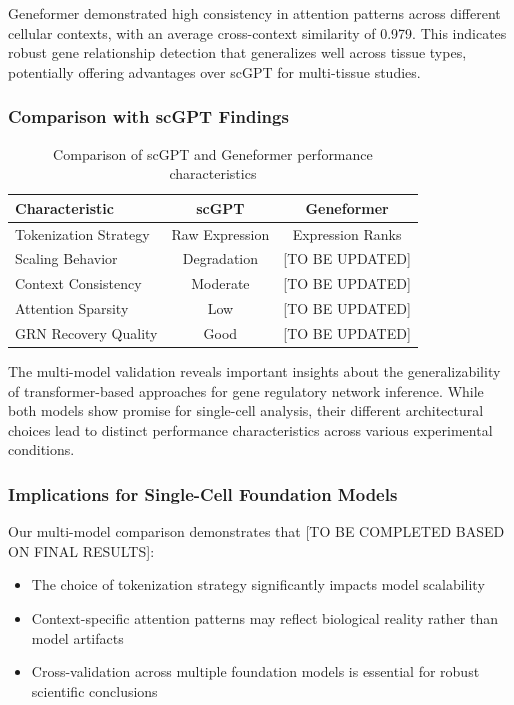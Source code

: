 Geneformer demonstrated high consistency in attention patterns across different cellular contexts, with an average cross-context similarity of 0.979. This indicates robust gene relationship detection that generalizes well across tissue types, potentially offering advantages over scGPT for multi-tissue studies.

\subsubsection{Comparison with scGPT Findings}

\begin{table}[h]
\centering
\caption{Comparison of scGPT and Geneformer performance characteristics}
\label{tab:model_comparison}
\begin{tabular}{lcc}
\hline
\textbf{Characteristic} & \textbf{scGPT} & \textbf{Geneformer} \\
\hline
Tokenization Strategy & Raw Expression & Expression Ranks \\
Scaling Behavior & Degradation & [TO BE UPDATED] \\
Context Consistency & Moderate & [TO BE UPDATED] \\
Attention Sparsity & Low & [TO BE UPDATED] \\
GRN Recovery Quality & Good & [TO BE UPDATED] \\
\hline
\end{tabular}
\end{table}

The multi-model validation reveals important insights about the generalizability of transformer-based approaches for gene regulatory network inference. While both models show promise for single-cell analysis, their different architectural choices lead to distinct performance characteristics across various experimental conditions.

\subsubsection{Implications for Single-Cell Foundation Models}

Our multi-model comparison demonstrates that [TO BE COMPLETED BASED ON FINAL RESULTS]:
\begin{itemize}
\item The choice of tokenization strategy significantly impacts model scalability
\item Context-specific attention patterns may reflect biological reality rather than model artifacts
\item Cross-validation across multiple foundation models is essential for robust scientific conclusions
\end{itemize}

